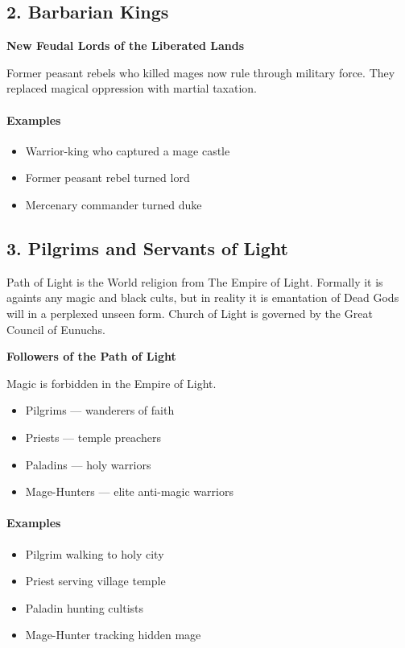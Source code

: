 \subsection{2. Barbarian Kings}

\textbf{New Feudal Lords of the Liberated Lands}

Former peasant rebels who killed mages now rule through military force. They replaced magical oppression with martial taxation.

\paragraph{Examples}
\begin{itemize}
\item Warrior-king who captured a mage castle
\item Former peasant rebel turned lord
\item Mercenary commander turned duke
\end{itemize}



\subsection{3. Pilgrims and Servants of Light}

Path of Light is the World religion from The Empire of Light. Formally it is againts any magic and black cults, but in reality it is emantation of Dead Gods will in a perplexed unseen form. Church of Light is governed by the Great Council of Eunuchs.

\textbf{Followers of the Path of Light}

Magic is forbidden in the Empire of Light.

\begin{itemize}
\item Pilgrims — wanderers of faith
\item Priests — temple preachers
\item Paladins — holy warriors
\item Mage-Hunters — elite anti-magic warriors
\end{itemize}

\paragraph{Examples}
\begin{itemize}
\item Pilgrim walking to holy city
\item Priest serving village temple
\item Paladin hunting cultists
\item Mage-Hunter tracking hidden mage
\end{itemize}



